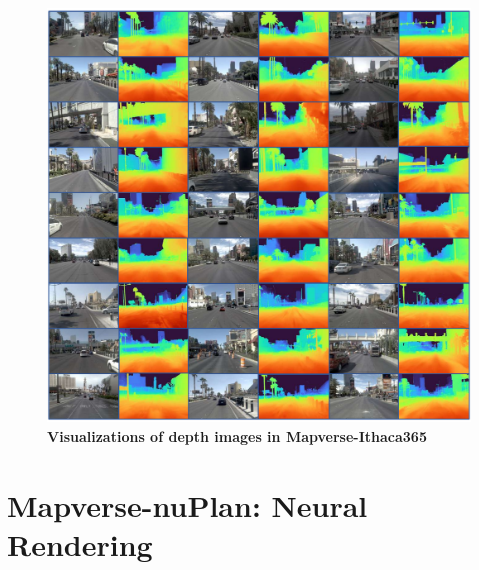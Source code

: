 \begin{figure}[ht]
\vspace{10mm}
    \centering
    \includegraphics[width=\linewidth]{figs_compressed/nuplan-depth-app_compressed.pdf}
    \caption{\textbf{Visualizations of depth images in Mapverse-Ithaca365}}
    \label{fig:nuplan-depth-appendix}
\end{figure}


\clearpage
\section{Mapverse-nuPlan: Neural Rendering}
\label{sec:rendering-nuplan-app}


